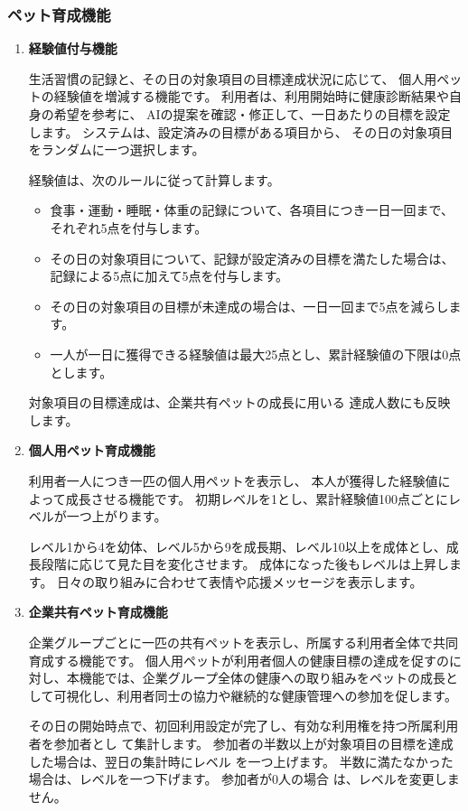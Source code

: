 \documentclass[uplatex,dvipdfmx]{jlreq}
\begin{document}
\subsubsection{ペット育成機能}
\begin{enumerate}
\item \textbf{経験値付与機能}

生活習慣の記録と、その日の対象項目の目標達成状況に応じて、
個人用ペットの経験値を増減する機能です。
利用者は、利用開始時に健康診断結果や自身の希望を参考に、
AIの提案を確認・修正して、一日あたりの目標を設定します。
システムは、設定済みの目標がある項目から、
その日の対象項目をランダムに一つ選択します。

経験値は、次のルールに従って計算します。

\begin{itemize}
  \item 食事・運動・睡眠・体重の記録について、各項目につき一日一回まで、それぞれ5点を付与します。
  \item その日の対象項目について、記録が設定済みの目標を満たした場合は、記録による5点に加えて5点を付与します。
  \item その日の対象項目の目標が未達成の場合は、一日一回まで5点を減らします。
  \item 一人が一日に獲得できる経験値は最大25点とし、累計経験値の下限は0点とします。
\end{itemize}

対象項目の目標達成は、企業共有ペットの成長に用いる
達成人数にも反映します。

\item \textbf{個人用ペット育成機能}

利用者一人につき一匹の個人用ペットを表示し、
本人が獲得した経験値によって成長させる機能です。
初期レベルを1とし、累計経験値100点ごとにレベルが一つ上がります。

レベル1から4を幼体、レベル5から9を成長期、レベル10以上を成体とし、成長段階に応じて見た目を変化させます。
成体になった後もレベルは上昇します。
日々の取り組みに合わせて表情や応援メッセージを表示します。

\item \textbf{企業共有ペット育成機能}

企業グループごとに一匹の共有ペットを表示し、所属する利用者全体で共同育成する機能です。
個人用ペットが利用者個人の健康目標の達成を促すのに対し、本機能では、企業グループ全体の健康への取り組みをペットの成長として可視化し、利用者同士の協力や継続的な健康管理への参加を促します。

その日の開始時点で、初回利用設定が完了し、有効な利用権を持つ所属利用者を参加者とし て集計します。
参加者の半数以上が対象項目の目標を達成した場合は、翌日の集計時にレベル を一つ上げます。
半数に満たなかった場合は、レベルを一つ下げます。
参加者が0人の場合 は、レベルを変更しません。


\end{enumerate}
\end{document}
